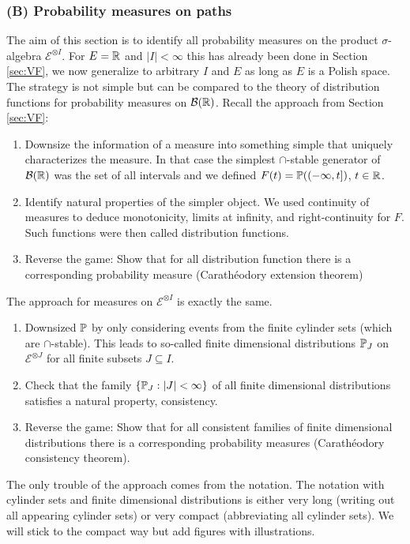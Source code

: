 \subsubsection{(B) Probability measures on paths}
The aim of this section is to identify all probability measures on the product $\sigma$-algebra $\mathcal E^{\otimes I}$. For $E=\R$ and $|I|<\infty$ this has already been done in Section \ref{sec:VF}, we now generalize to arbitrary $I$ and $E$ as long as $E$ is a Polish space. The strategy is not simple but can be compared to the theory of distribution functions for probability measures on $\mathcal B(\R)$. Recall the approach from Section \ref{sec:VF}:
\begin{enumerate}[label=(\roman*)]
	\item Downsize the information of a measure into something simple that uniquely characterizes the measure. In that case the simplest $\cap$-stable generator of $\mathcal B(\R)$ was the set of all intervals and we defined $F(t)=\P((-\infty,t])$, $t\in\R$.
	\item Identify natural properties of the simpler object. We used continuity of measures to deduce monotonicity, limits at infinity, and right-continuity for $F$. Such functions were then called distribution functions.
	\item Reverse the game: Show that for all distribution function there is a corresponding probability measure (Carath\'eodory extension theorem)
\end{enumerate}
The approach for measures on $\mathcal E^{\otimes I}$ is exactly the same.
\begin{enumerate}[label=(\roman*)]
	\item Downsized $\P$ by only considering events from the finite cylinder sets (which are $\cap$-stable). This leads to so-called finite dimensional distributions $\P_J$ on $\mathcal E^{\otimes J}$ for all finite subsets $J\subseteq I$.
	\item Check that the family $\{\P_J: |J|<\infty\}$ of all finite dimensional distributions satisfies a natural property, consistency.
	\item Reverse the game: Show that for all consistent families of finite dimensional distributions there is a corresponding probability measures (Carath\'eodory consistency theorem).
\end{enumerate}
The only trouble of the approach comes from the notation. The notation with cylinder sets and finite dimensional distributions is either very long (writing out all appearing cylinder sets) or very compact (abbreviating all cylinder sets). We will stick to the compact way but add figures with illustrations.\smallskip

